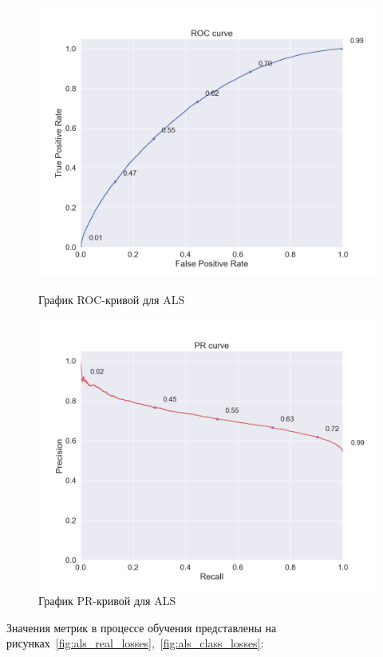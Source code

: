\begin{figure}[h!]
\centering
\begin{minipage}{.5\textwidth}
\centering
\includegraphics[width=0.9\linewidth]{images/als/roc_curve}
\caption{График ROC-кривой для ALS}
\label{fig:als_roc}
\end{minipage}%
\begin{minipage}{.5\textwidth}
\centering
\includegraphics[width=0.9\linewidth]{images/als/pr_curve}
\caption{График PR-кривой для ALS}
\label{fig:als_pr}
\end{minipage}
\end{figure}

Значения метрик в процессе обучения представлены на рисунках~\ref{fig:als_real_losses},~\ref{fig:als_class_losses}:

